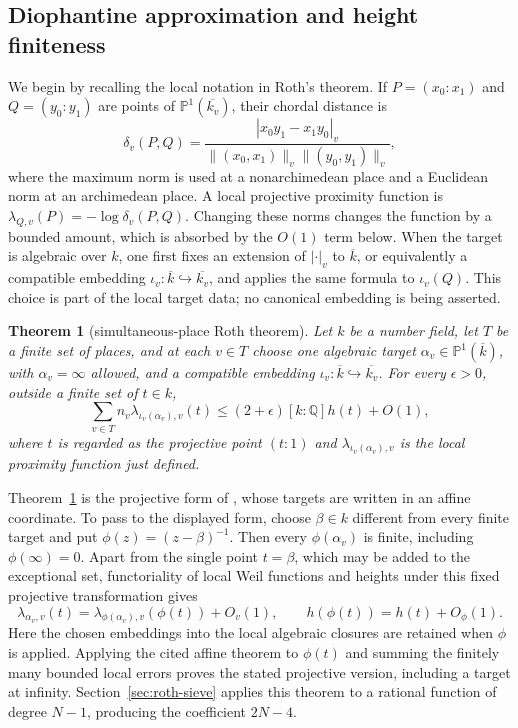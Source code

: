 \documentclass[11pt,reqno]{amsart}
\newtheorem{theorem}{Theorem}[section]
\theoremstyle{definition}
\theoremstyle{remark}
\newcommand{\Q}{\mathbb Q}
\begin{document}
\subsection{Diophantine approximation and height finiteness}

We begin by recalling the local notation in Roth's theorem.  If
\(P=(x_0:x_1)\) and \(Q=(y_0:y_1)\) are points of
\(\mathbb P^1(\overline{k_v})\), their chordal distance is
\[
 \delta_v(P,Q)=
 \frac{|x_0y_1-x_1y_0|_v}
      {\lVert(x_0,x_1)\rVert_v\lVert(y_0,y_1)\rVert_v},
\]
where the maximum norm is used at a nonarchimedean place and a Euclidean
norm at an archimedean place.  A local projective proximity function is
\(\lambda_{Q,v}(P)=-\log\delta_v(P,Q)\).  Changing these norms changes the
function by a bounded amount, which is absorbed by the \(O(1)\) term below.
When the target is algebraic over \(k\), one first fixes an extension of
\(|\cdot|_v\) to \(\overline k\), or equivalently a compatible embedding
\(\iota_v:\overline k\hookrightarrow\overline{k_v}\), and applies the
same formula to \(\iota_v(Q)\).  This choice is part of the local target
data; no canonical embedding is being asserted.

\begin{theorem}[simultaneous-place Roth theorem]
\label{input:roth}
Let \(k\) be a number field, let \(T\) be a finite set of places, and at
each \(v\in T\) choose one algebraic target
\(\alpha_v\in\mathbb P^1(\overline k)\), with \(\alpha_v=\infty\) allowed,
and a compatible embedding
\(\iota_v:\overline k\hookrightarrow\overline{k_v}\).
For every \(\epsilon>0\), outside a finite set of \(t\in k\),
\[
 \sum_{v\in T}n_v\lambda_{\iota_v(\alpha_v),v}(t)
 \le(2+\epsilon)[k:\Q]h(t)+O(1),
\]
where \(t\) is regarded as the projective point \((t:1)\) and
\(\lambda_{\iota_v(\alpha_v),v}\) is the local proximity function just
defined.
\end{theorem}

Theorem~\ref{input:roth} is the projective form of
\cite[Theorem~6.4.1]{BombieriGubler}, whose targets are written in an
affine coordinate.  To pass to the displayed form, choose
\(\beta\in k\) different from every finite target and put
\(\phi(z)=(z-\beta)^{-1}\).  Then every \(\phi(\alpha_v)\) is finite,
including \(\phi(\infty)=0\).  Apart from the single point
\(t=\beta\), which may be added to the exceptional set, functoriality of
local Weil functions and heights under this fixed projective transformation
gives
\[
 \lambda_{\alpha_v,v}(t)
 =\lambda_{\phi(\alpha_v),v}(\phi(t))+O_v(1),
 \qquad h(\phi(t))=h(t)+O_\phi(1).
\]
Here the chosen embeddings into the local algebraic closures are retained
when \(\phi\) is applied.  Applying the cited affine theorem to \(\phi(t)\)
and summing the finitely many bounded local errors proves the stated
projective version, including a target at infinity.
Section~\ref{sec:roth-sieve} applies this theorem to a rational function of
degree \(N-1\), producing the coefficient \(2N-4\).
\end{document}
